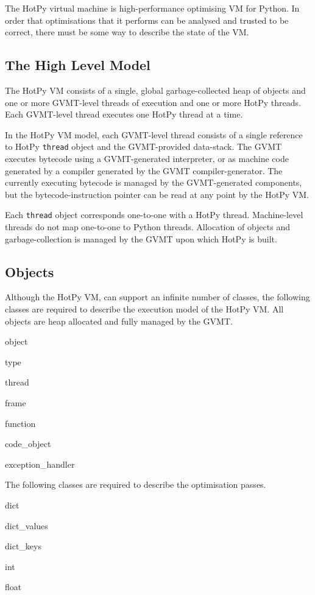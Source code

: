 
The HotPy virtual machine is high-performance optimising VM for Python. In order that optimisations that it performs can be analysed and trusted to be correct, there must be some way to describe the state of the VM.

\subsection{The High Level Model}

The HotPy VM consists of a single, global garbage-collected heap of objects and one or more GVMT-level threads of execution and one or more 
HotPy threads. Each GVMT-level thread executes one HotPy thread at a time. 

In the HotPy VM model, each GVMT-level thread consists of a single reference to HotPy \verb|thread| object and the GVMT-provided data-stack.
The GVMT executes bytecode using a GVMT-generated interpreter, or as machine code generated by a compiler generated by the GVMT compiler-generator.
The currently executing bytecode is managed by the GVMT-generated components, but the bytecode-instruction pointer can be read at any point by the HotPy VM.

Each \verb|thread| object corresponds one-to-one with a HotPy thread.
Machine-level threads do not map one-to-one to Python threads. Allocation of objects and garbage-collection is managed by the GVMT upon which HotPy is built.

\subsection{Objects}

Although the HotPy VM, can support an infinite number of classes,
the following classes are required to describe the execution model of the HotPy VM.
All objects are heap allocated and fully managed by the GVMT.

\begin{myitemize}
\item object
\item type
\item thread
\item frame
\item function
\item code\_object
\item exception\_handler
\end{myitemize}

The following classes are required  to describe the optimisation passes.
\begin{myitemize}
\item dict
\item dict\_values
\item dict\_keys
\item int
\item float
\end{myitemize}

